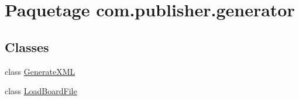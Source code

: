 \hypertarget{namespacecom_1_1publisher_1_1generator}{\section{Paquetage com.\-publisher.\-generator}
\label{namespacecom_1_1publisher_1_1generator}
}
\subsection*{Classes}
\begin{DoxyCompactItemize}
\item 
class \hyperlink{classcom_1_1publisher_1_1generator_1_1GenerateXML}{Generate\-X\-M\-L}
\item 
class \hyperlink{classcom_1_1publisher_1_1generator_1_1LoadBoardFile}{Load\-Board\-File}
\end{DoxyCompactItemize}
